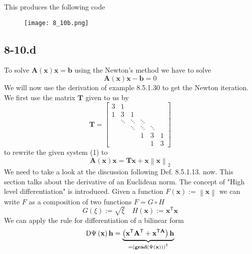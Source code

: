\documentclass{article}
\begin{document}
\pagebreak

This produces the following code
\begin{figure}[!hbt]
    \centering
    \texttt{[image: 8\_10b.png]}
\end{figure}

\subsection*{8-10.d} 
To solve $\mathbf{A}\left(\mathbf{x}\right)\mathbf{x} = \mathbf{b}$ using the Newton's method we have to solve
\begin{equation*}
    \mathbf{A}\left(\mathbf{x}\right)\mathbf{x} - \mathbf{b} = 0
\end{equation*} We will now use the derivation of example 8.5.1.30 to get the Newton iteration. We first use the matrix $\mathbf{T}$ given to us by
\begin{equation*}
    \mathbf{T} = \begin{bmatrix}
        3 & 1 & & &  \\
        1 & 3 & 1 &&\\
        & \ddots & \ddots & \ddots && \\
        &&\ddots & \ddots & \ddots & \\
        &&& 1 & 3 & 1 \\
        &&&& 1 & 3 
    \end{bmatrix}
\end{equation*}
to rewrite the given system (1) to
\begin{equation*}
    \mathbf{A}\left(\mathbf{x}\right)\mathbf{x} = \mathbf{T}\mathbf{x} + \mathbf{x}\left\lVert \mathbf{x} \right\rVert_{2}
\end{equation*}
We need to take a look at the discussion following Def. 8.5.1.13. now. This section talks about the derivative of an Euclidean norm. The concept of "High level differentiation" is introduced. Given a function $F\left(\mathbf{x}\right) := \left\lVert \mathbf{x}\right\rVert$ we can write $F$ as a composition of two functions $F = G \circ H$ 
\begin{equation*}
    G\left(\xi\right) := \sqrt{\xi} \quad H\left(\mathbf{x}\right) := \mathbf{x}^{\mathsf{T}}\mathbf{x}
\end{equation*}
We can apply the rule for differentiation of a bilinear form
\begin{equation*}
    \mathrm{D}\Psi\left(\mathbf{x}\right) \mathbf{h} = \underbrace{\left(\mathbf{x}^{\mathsf{T}}\mathbf{A}^{\mathsf{T}} + \mathbf{x}^{\mathsf{T}\mathbf{A}}\right)\mathbf{h}}_{=\left(\text{\textbf{grad}}\left(\Psi\left(\mathbf{x}\right)\right)\right)^{\mathsf{T}}}
\end{equation*}
\end{document}
